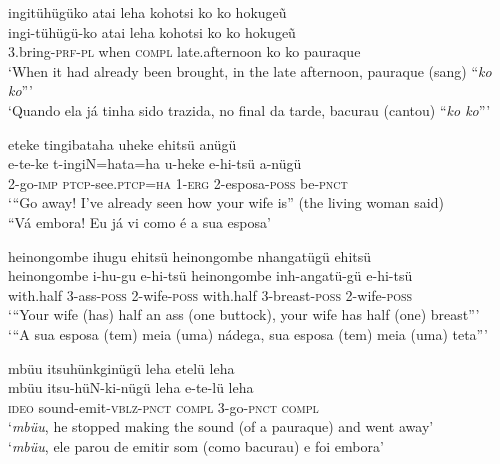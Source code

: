 \documentclass[output=paper,
modfonts,nonflat
]{langsci/langscibook}
\begin{document}
 
\ea ingitühügüko atai leha kohotsi ko ko hokugeũ \\[.3em]
\gll ingi-tühügü-ko atai leha kohotsi ko ko  hokugeũ \\
3.bring-\textsc{prf-pl} when \textsc{compl} late.afternoon ko ko pauraque \\
\glt ‘When it had already been brought, in the late afternoon, pauraque (sang) “\textit{ko ko}”’ \\
‘Quando ela já tinha sido trazida, no final da tarde, bacurau (cantou) “\textit{ko ko}”’ \\
\z

\ea eteke tingibataha uheke ehitsü anügü \\[.3em]
\gll e-te-ke t-ingiN=hata=ha u-heke e-hi-tsü a-nügü \\
2-go-\textsc{imp} \textsc{ptcp}-see.\textsc{ptcp=ha} \textsc{1-erg} 2-esposa-\textsc{poss} be-\textsc{pnct} \\
\glt ‘“Go away! I’ve already seen how your wife is” (the living woman said) \\
“Vá embora! Eu já vi como é a sua esposa’ \\
\z

\ea heinongombe ihugu ehitsü heinongombe nhangatügü ehitsü \\[.3em]
\gll heinongombe i-hu-gu e-hi-tsü heinongombe inh-angatü-gü e-hi-tsü \\
with.half 3-ass-\textsc{poss} 2-wife-\textsc{poss} with.half 3-breast-\textsc{poss} 2-wife-\textsc{poss} \\
\glt ‘“Your wife (has) half an ass (one buttock), your wife has half (one) breast”’ \\
‘“A sua esposa (tem) meia (uma) nádega, sua esposa (tem) meia (uma) teta”’ \\
\z

\newpage 
\ea mbüu itsuhünkginügü{\footnotemark} leha etelü leha \\[.3em]
\gll mbüu itsu-hüN-ki-nügü leha e-te-lü leha \\
\textsc{ideo} sound-emit-\textsc{vblz-pnct} \textsc{compl} 3-go\textsc{-pnct} \textsc{compl} \\
\glt ‘\textit{mbüu}, he stopped making the sound (of a pauraque) and went away’ \\
‘\textit{mbüu}, ele parou de emitir som (como bacurau) e foi embora’ \\
\z
\end{document}
